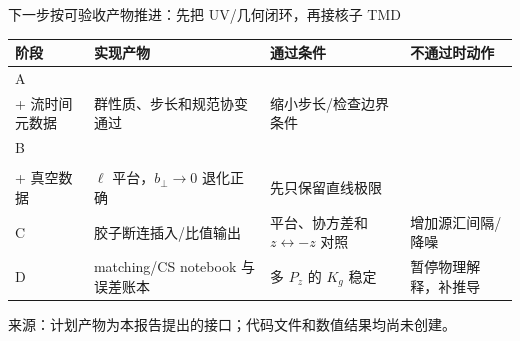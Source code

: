 \documentclass[UTF8,aspectratio=169,11pt]{ctexbeamer}
\newcommand{\source}[1]{%
  \par\vspace{0.05em}%
  {\raggedright\scriptsize\color{muted}来源：#1\par}}
\begin{document}
\begin{frame}[t]{下一步按可验收产物推进：先把 UV/几何闭环，再接核子 TMD}
  \begin{center}
  \end{center}
  \vspace{0.18em}
  {\footnotesize
  \begin{tabularx}{\textwidth}{@{}>{\raggedright\arraybackslash}p{1.25cm}>{\raggedright\arraybackslash}p{3.2cm}>{\raggedright\arraybackslash}X>{\raggedright\arraybackslash}p{2.35cm}@{}}
    \toprule
    阶段 & 实现产物 & 通过条件 & 不通过时动作 \\
    \midrule
    A & \begin{tabular}[t]{@{}l@{}}\path{flow_links.py}\\[-0.15em]+ 流时间元数据\end{tabular} & 群性质、步长和规范协变通过 & 缩小步长/检查边界条件 \\
    B & \begin{tabular}[t]{@{}l@{}}\path{gluon_staple_}\\[-0.15em]\path{soft.py}\\[-0.15em]+ 真空数据\end{tabular} & $\ell$ 平台，$b_\perp\to0$ 退化正确 & 先只保留直线极限 \\
    C & 胶子断连插入/比值输出 & 2pt 平台、协方差和 $z\leftrightarrow-z$ 对照 & 增加源汇间隔/降噪 \\
    D & matching/CS notebook 与误差账本 & 多 $P_z$ 的 $K_g$ 稳定 & 暂停物理解释，补推导 \\
    \bottomrule
  \end{tabularx}\par}
  \source{计划产物为本报告提出的接口；代码文件和数值结果均尚未创建。}
\end{frame}
\end{document}

